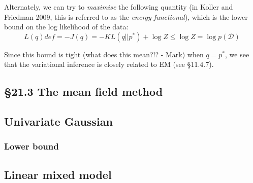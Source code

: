 \documentclass{amsart}
\begin{document}
Alternately, we can try to \emph{maximise} the following quantity (in Koller and Friedman
2009, this is referred to as the \emph{energy functional}), which is the lower bound on
the log likelihood of the data:
\[
L(q) def = -J(q) = -KL(q||p^{*}) + \log{Z} \leq \log{Z} = \log{p(\mathcal{D})}
\]

Since this bound is tight (what does this mean?!? - Mark) when $q=p^{*}$, we see that the
variational inference is closely related to EM (see \S 11.4.7).


\subsection{\S 21.3 The mean field method}

\subsection{Univariate Gaussian}

\subsubsection{Lower bound}

\subsection{Linear mixed model}
\end{document}
